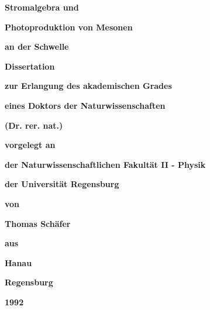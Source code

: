 \voffset-1.5cm

\hoffset-1.5cm

%


%



\baselineskip18pt

\parindent0pt



\begin{titlepage}

\centerline{\huge \bf Stromalgebra und}

\vspace{0.8cm}

\centerline{\huge \bf Photoproduktion von Mesonen}

\vspace{0.8cm}

\centerline{\huge \bf an der Schwelle}  

\vspace{2.5cm}

\centerline{\bf Dissertation}

\centerline{\bf zur Erlangung des akademischen Grades}

\centerline{\bf eines Doktors der Naturwissenschaften}

\centerline{\bf (Dr. rer. nat.)}

\vspace{2.0cm}

\centerline{\bf vorgelegt an}

\centerline{\bf der Naturwissenschaftlichen Fakult\"at II - Physik}

\centerline{\bf der Universit\"at Regensburg}

\vspace{2.5cm}

\centerline{\bf von}

\centerline{\bf Thomas Sch\"afer }

\centerline{\bf aus}

\centerline{\bf Hanau} 

\vspace{1cm}

\centerline{\bf Regensburg}

\centerline{\bf 1992}

\vspace{0.5cm}

\end{titlepage}

